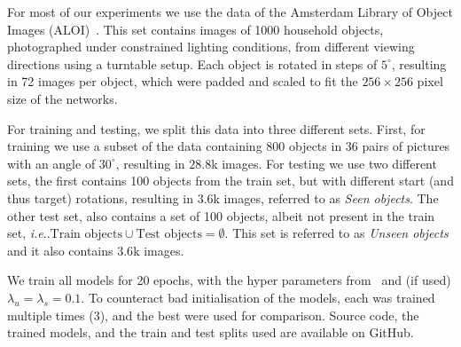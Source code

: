 \documentclass[runningheads]{llncs}
\makeatletter
\DeclareRobustCommand\onedot{\futurelet\@let@token\@onedot}
\def\@onedot{\ifx\@let@token.\else.\null\fi\xspace}
\def\ie{\emph{i.e}\onedot} \def\Ie{\emph{I.e}\onedot}
\newcommand{\myparagraph}[1]{\vspace{-2mm}\paragraph{\textbf{#1}}}
\makeatother
\begin{document}
For most of our experiments we use the data of the Amsterdam Library of Object Images (ALOI)~\cite{geusebroek2005amsterdam}.
This set contains images of 1000 household objects, photographed under constrained lighting conditions, from different viewing directions using a turntable setup.
Each object is rotated in steps of $5^\circ$, resulting in 72 images per object, which were padded and scaled to fit the $256\times256$ pixel size of the networks.

For training and testing, we split this data into three different sets.
First, for training we use a subset of the data containing 800 objects in 36 pairs of pictures with an angle of $30^\circ$, resulting in $28.8$k images.
For testing we use two different sets, the first contains 100 objects from the train set, but with different start (and thus target) rotations, resulting in $3.6$k images, referred to as \emph{Seen objects}.
The other test set, also contains a set of 100 objects, albeit not present in the train set, \ie$\text{Train objects} \cup \text{Test objects} = \emptyset$.
This set is referred to as \emph{Unseen objects} and it also contains $3.6$k images.

We train all models for 20 epochs, with the hyper parameters from~\cite{pix2pix2016} and (if used) $\lambda_u = \lambda_s =0.1$.
To counteract bad initialisation of the models, each was trained multiple times (3), and the best were used for comparison.
Source code, the trained models, and the train and test splits used are available on GitHub.
\end{document}
